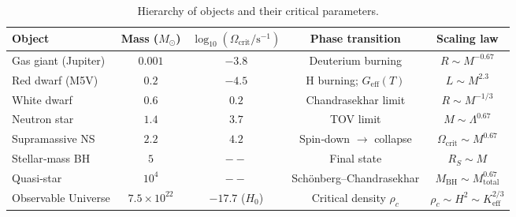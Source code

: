 \documentclass[12pt,a4paper]{article}
\begin{document}
	\begin{otherlanguage}{english}
		\begin{table}[htbp]
			\centering
			\caption{ Hierarchy of objects and their critical parameters.}
			\label{tab:hierarchy}
			\small
			\begin{tabular}{l c c c c}
				\toprule
				\textbf{Object} & \textbf{Mass (\(M_\odot\))} & \(\log_{10}(\Omega_{\mathrm{crit}}/\mathrm{s^{-1}})\) & \textbf{Phase transition} & \textbf{Scaling law} \\
				\midrule
				Gas giant (Jupiter) & \(0.001\) & \(-3.8\) & Deuterium burning & \(R\sim M^{-0.67}\) \\
				Red dwarf (M5V) & \(0.2\) & \(-4.5\) & H burning; \(G_{\mathrm{eff}}(T)\) & \(L\sim M^{2.3}\) \\
				White dwarf & \(0.6\) & \(0.2\) & Chandrasekhar limit & \(R\sim M^{-1/3}\) \\
				Neutron star & \(1.4\) & \(3.7\) & TOV limit & \(M\sim\Lambda^{0.67}\) \\
				Supramassive NS & \(2.2\) & \(4.2\) & Spin‑down \(\to\) collapse & \(\Omega_{\mathrm{crit}}\sim M^{0.67}\) \\
				Stellar‑mass BH & \(5\) & \(--\) & Final state & \(R_S\sim M\) \\
				Quasi‑star & \(10^4\) & \(--\) & Schönberg–Chandrasekhar & \(M_{\mathrm{BH}}\sim M_{\mathrm{total}}^{0.67}\) \\
				Observable Universe & \(7.5\times10^{22}\) & \(-17.7\) (\(H_0\)) & Critical density \(\rho_c\) & \(\rho_c\sim H^2\sim K_{\mathrm{eff}}^{2/3}\) \\
				\bottomrule
			\end{tabular}
		\end{table}
	\end{otherlanguage}
	
\end{document}
